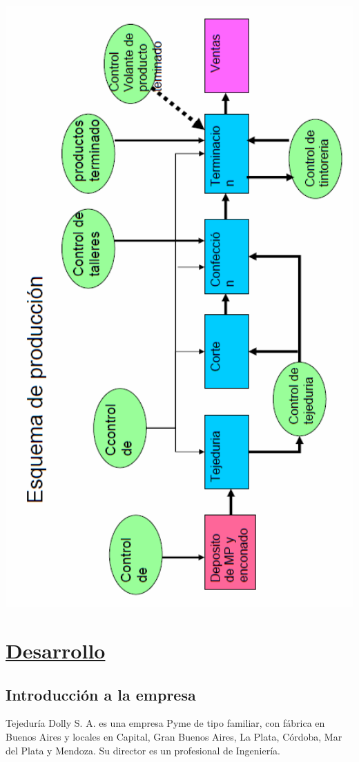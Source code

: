 \documentclass[a4paper,12pt,titlepage]{article}
\begin{document}
\includegraphics[width=400pt]{./DollyEsquemaProduccion.png}



\newpage
\section{\underline{Desarrollo}}
	\subsection {Introducci\'{o}n a la empresa}
	Tejedur\'{i}a Dolly S. A. es una empresa Pyme de tipo familiar, con f\'{a}brica en Buenos Aires y locales en Capital, Gran Buenos Aires, La Plata, C\'{o}rdoba, Mar del Plata y Mendoza. Su director es un profesional de Ingenier\'{i}a.\\
	
\end{document}
